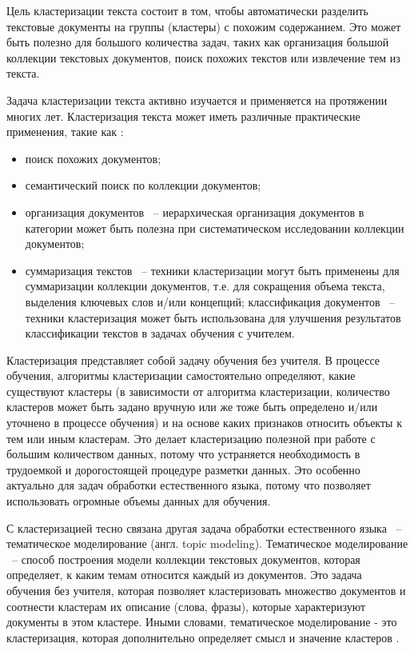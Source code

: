 Цель кластеризации текста состоит в том, чтобы автоматически разделить текстовые документы на группы (кластеры) с похожим содержанием. Это может быть полезно для большого количества задач, таких как организация большой коллекции текстовых документов, поиск похожих текстов или извлечение тем из текста.

Задача кластеризации текста активно изучается и применяется на протяжении многих лет. Кластеризация текста может иметь различные практические применения, такие как \cite{text-clustering-survey}:
\begin{itemize}
    \item поиск похожих документов;
    \item семантический поиск по коллекции документов;
    \item организация документов ~-- иерархическая организация документов в категории может быть полезна при систематическом исследовании коллекции документов;
    \item суммаризация текстов ~-- техники кластеризации могут быть применены для суммаризации коллекции документов, т.е. для сокращения объема текста, выделения ключевых слов и/или концепций;
     классификация документов ~-- техники кластеризация может быть использована для улучшения результатов классификации текстов в задачах обучения с учителем.
\end{itemize}

Кластеризация представляет собой задачу обучения без учителя. В процессе обучения, алгоритмы кластеризации самостоятельно определяют, какие существуют кластеры (в зависимости от алгоритма кластеризации, количество кластеров может быть задано вручную или же тоже быть определено и/или уточнено в процессе обучения) и на основе каких признаков относить объекты к тем или иным кластерам. Это делает кластеризацию полезной при работе с большим количеством данных, потому что устраняется необходимость в трудоемкой и дорогостоящей процедуре разметки данных. Это особенно актуально для задач обработки естественного языка, потому что позволяет использовать огромные объемы данных для обучения.

С кластеризацией тесно связана другая задача обработки естественного языка ~-- тематическое моделирование (англ. topic modeling). Тематическое моделирование ~-- способ построения модели коллекции текстовых документов, которая определяет, к каким темам относится каждый из документов. Это задача обучения без учителя, которая позволяет кластеризовать множество документов и соотнести кластерам их описание (слова, фразы), которые характеризуют документы в этом кластере. Иными словами, тематическое моделирование - это кластеризация, которая дополнительно определяет смысл и значение кластеров \cite{no-patterns}.

